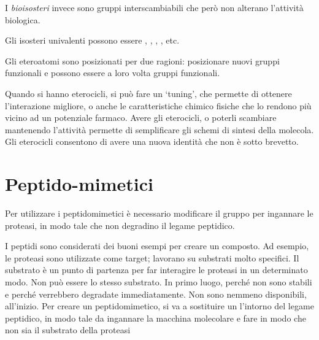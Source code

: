 I \emph{bioisosteri} invece sono gruppi interscambiabili che però non alterano
l'attività biologica.

Gli isosteri univalenti possono essere , ,  , , etc.



Gli eteroatomi sono posizionati per due ragioni: posizionare nuovi
gruppi funzionali e possono essere a loro volta gruppi funzionali.



Quando si hanno eterocicli, si può fare un `tuning', che permette di
ottenere l'interazione migliore, o anche le caratteristiche chimico
fisiche che lo rendono più vicino ad un potenziale farmaco.
Avere gli eterocicli, o poterli scambiare mantenendo l'attività permette
di semplificare gli schemi di sintesi della molecola.
Gli eterocicli consentono di avere una nuova identità che non è sotto brevetto.

\section{Peptido-mimetici}

Per utilizzare i peptidomimetici è necessario modificare il gruppo per ingannare le proteasi, in modo tale
che non degradino il legame peptidico.

I peptidi sono considerati dei buoni esempi per creare un composto. Ad
esempio, le proteasi sono utilizzate come target; lavorano su substrati
molto specifici.
Il substrato è un punto di partenza per far interagire le proteasi in un
determinato modo. Non può essere lo stesso substrato. In primo luogo,
perché non sono stabili e perché verrebbero degradate immediatamente.
Non sono nemmeno disponibili, all'inizio.
Per creare un peptidomimetico, si va a sostituire un l'intorno del
legame peptidico, in modo tale da ingannare la macchina molecolare e
fare in modo che non sia il substrato della proteasi

